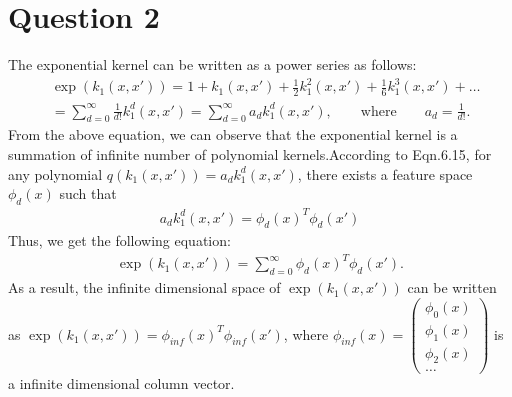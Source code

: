 \documentclass[paper=a4, fontsize=15pt]{article} %
\begin{document}
\section*{Question 2}
The exponential kernel can be written as a power series as follows:
\begin{align*}
&\exp(k_1(x,x')) 
 = 1 + k_1(x,x') + \frac{1}{2}k^2_1(x,x') + \frac{1}{6}k^3_1(x,x') + \ldots\\
& = \sum_{d = 0}^\infty \frac{1}{d!} k_1^d(x,x') 
 = \sum_{d = 0}^\infty a_d k_1^d(x,x'), \qquad \text{where} \qquad a_d = \frac{1}{d!}.
\end{align*}
From the above equation, we can observe that the exponential kernel is a summation of infinite number of polynomial kernels.According to Eqn.6.15, for any polynomial 
$q(k_1(x,x')) = a_d k_1^d(x,x')$, there exists a feature space $\phi_d(x)$ such that 
\begin{align*}
a_d k_1^d(x,x') = \phi_d(x)^T\phi_d(x')
\end{align*}
Thus, we get the following equation:
\begin{align*}
\exp(k_1(x,x')) = \sum_{d = 0}^\infty \phi_d(x)^T\phi_d(x').
\end{align*}
As a result, the infinite dimensional space of $\exp(k_1(x,x')) $ can be written as
$\exp(k_1(x,x'))  = \phi_{inf}(x)^T\phi_{inf}(x')$, 
where $\phi_{inf}(x) = \begin{pmatrix} \phi_{0}(x)\\ \phi_{1}(x)\\ \phi_{2}(x)\\ \ldots \end{pmatrix}$
 is a infinite dimensional column vector.
\end{document}
